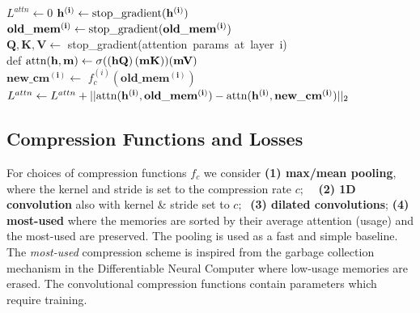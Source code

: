 \begin{algorithm}
    \caption{Attention-Reconstruction Loss}
    \label{alg:loss}
    \begin{algorithmic}[1] 
    \STATE $L^{attn} \leftarrow 0$
        \STATE $\mathbf{h^{(i)}} \leftarrow \hbox{stop\_gradient}(\mathbf{h^{(i)}})$ \\
        \STATE $\mathbf{old\_mem^{(i)}} \leftarrow \hbox{stop\_gradient}(\mathbf{old\_mem^{(i)}})$   \\
        \STATE $\mathbf{Q, K, V} \leftarrow$ \hbox{stop\_gradient(attention params at layer i)} \\
        \STATE def $\hbox{attn}(\mathbf{h}, \mathbf{m}) \leftarrow \sigma(\mathbf{(hQ) \, (mK)})(\mathbf{mV})$  \\
        \STATE $\mathbf{new\_cm^{(i)}} \leftarrow $ $f^{(i)}_c(\mathbf{old\_mem^{(i)}})$  \\
        \STATE $L^{attn} \leftarrow L^{attn} + ||\hbox{attn}(\mathbf{h^{(i)}}, \mathbf{old\_mem^{(i)}}) - \hbox{attn}(\mathbf{h^{(i)}}, \mathbf{new\_cm^{(i)}})||_2$
    \ENDFOR 
    \end{algorithmic}
\end{algorithm}

\subsection{Compression Functions and Losses} For choices of compression functions $f_c$ we consider \textbf{(1) max/mean pooling}, where the kernel and stride is set to the compression rate $c$; $\quad$\textbf{(2) 1D convolution} also with kernel \& stride set to $c; \;$ \textbf{(3) dilated convolutions}; \textbf{(4) most-used} where the memories are sorted by their average attention (usage) and the most-used are preserved. The pooling is used as a fast and simple baseline. The \textit{most-used} compression scheme is inspired from the garbage collection mechanism in the Differentiable Neural Computer \citep{graves2016hybrid} where low-usage memories are erased. The convolutional compression functions contain parameters which require training.

